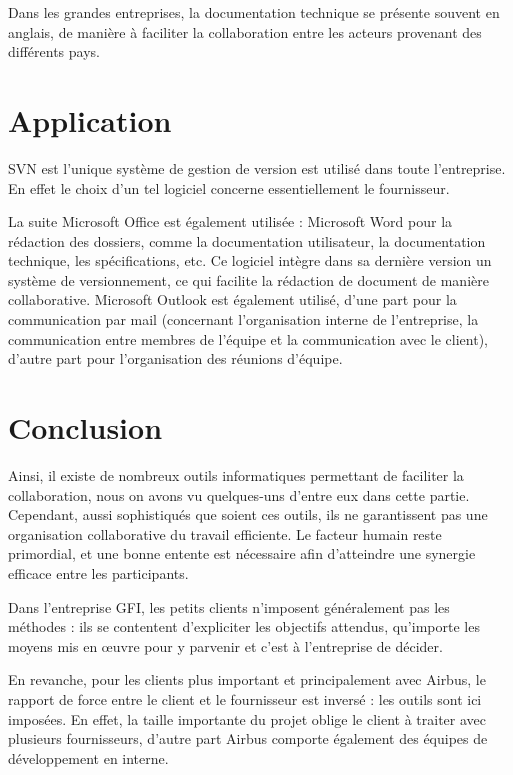 Dans les grandes entreprises, la documentation technique se présente souvent en anglais, de manière à faciliter la collaboration entre les acteurs provenant des différents pays.

\section{Application}

SVN est l'unique système de gestion de version est utilisé dans toute l'entreprise. En effet le choix d'un tel logiciel concerne essentiellement le fournisseur.

La suite Microsoft Office est également utilisée :
Microsoft Word pour la rédaction des dossiers, comme la documentation utilisateur, la documentation technique, les spécifications, etc. Ce logiciel intègre dans sa dernière version un système de versionnement, ce qui facilite la rédaction de document de manière collaborative.
Microsoft Outlook est également utilisé, d'une part pour la communication par mail (concernant l'organisation interne de l'entreprise, la communication entre membres de l'équipe et la communication avec le client), d'autre part pour l'organisation des réunions d'équipe.

\section{Conclusion}

Ainsi, il existe de nombreux outils informatiques permettant de faciliter la collaboration, nous on avons vu quelques-uns d'entre eux dans cette partie. Cependant, aussi sophistiqués que soient ces outils, ils ne garantissent pas une organisation collaborative du travail efficiente. Le facteur humain reste primordial, et une bonne entente est nécessaire afin d’atteindre une synergie efficace entre les participants.

\begin{app}
Dans l'entreprise GFI, les petits clients n'imposent généralement pas les méthodes : ils se contentent d'expliciter les objectifs attendus, qu'importe les moyens mis en œuvre pour y parvenir et c'est à l'entreprise de décider.

En revanche, pour les clients plus important et principalement avec Airbus, le rapport de force entre le client et le fournisseur est inversé : les outils sont ici imposées. En effet, la taille importante du projet oblige le client à traiter avec plusieurs fournisseurs, d'autre part Airbus comporte également des équipes de développement en interne.
\end{app}

